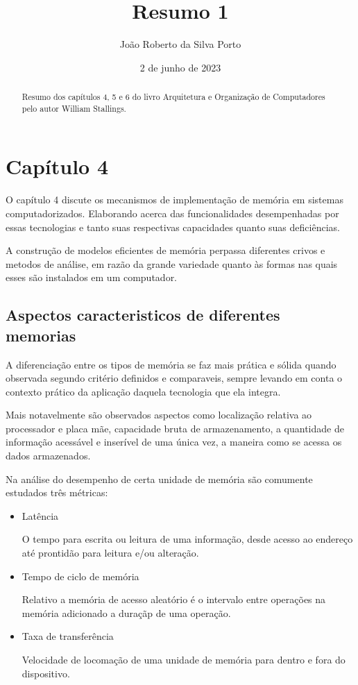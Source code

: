 \documentclass[12pt]{article}
\begin{document}
       
\title{Resumo 1}
\date{2 de junho de 2023}
\author{João Roberto da Silva Porto}

\begin{abstract}
Resumo dos capítulos 4, 5 e 6 do livro Arquitetura e Organização de Computadores pelo autor William Stallings.
\end{abstract}

\section{Capítulo 4}

O capítulo 4 discute os mecanismos de implementação de memória em sistemas computadorizados. Elaborando acerca das funcionalidades desempenhadas por essas tecnologias e tanto suas respectivas capacidades quanto suas deficiências.

A construção de modelos eficientes de memória perpassa diferentes crivos e metodos de análise, em razão da grande variedade quanto às formas nas quais esses são instalados em um computador.

\subsection{Aspectos caracteristicos de diferentes memorias}
A diferenciação entre os tipos de memória se faz mais prática e sólida quando observada segundo critério definidos e comparaveis, sempre levando em conta o contexto prático da aplicação daquela tecnologia que ela integra.

Mais notavelmente são observados aspectos como localização relativa ao processador e placa mãe, capacidade bruta de armazenamento, a quantidade de informação acessável e inserível de uma única vez, a maneira como se acessa os dados armazenados.

Na análise do desempenho de certa unidade de memória são comumente estudados três métricas:
\begin{itemize}
    \item Latência

    O tempo para escrita ou leitura de uma informação, desde acesso ao endereço até prontidão para leitura e/ou alteração.

    \item Tempo de ciclo de memória

    Relativo a memória de acesso aleatório é o intervalo entre operações na memória adicionado a duraçãp de uma operação.

    \item  Taxa de transferência

    Velocidade de locomação de uma unidade de memória para dentro e fora do dispositivo.
\end{itemize}
\end{document}
